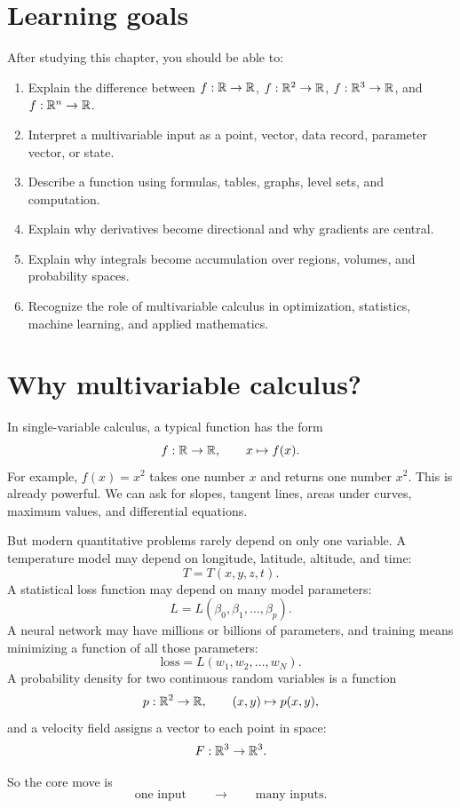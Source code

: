 \section*{Learning goals}

After studying this chapter, you should be able to:
\begin{enumerate}
  \item Explain the difference between $f:\mathbb{R}\to\mathbb{R}$, $f:\mathbb{R}^2\to\mathbb{R}$, $f:\mathbb{R}^3\to\mathbb{R}$, and $f:\mathbb{R}^n\to\mathbb{R}$.
  \item Interpret a multivariable input as a point, vector, data record, parameter vector, or state.
  \item Describe a function using formulas, tables, graphs, level sets, and computation.
  \item Explain why derivatives become directional and why gradients are central.
  \item Explain why integrals become accumulation over regions, volumes, and probability spaces.
  \item Recognize the role of multivariable calculus in optimization, statistics, machine learning, and applied mathematics.
\end{enumerate}

\section{Why multivariable calculus?}

In single-variable calculus, a typical function has the form
\[
  f:\mathbb{R}\to\mathbb{R},
  \qquad
  x\mapsto f(x).
\]
For example, $f(x)=x^2$ takes one number $x$ and returns one number $x^2$. This is already powerful. We can ask for slopes, tangent lines, areas under curves, maximum values, and differential equations.

But modern quantitative problems rarely depend on only one variable. A temperature model may depend on longitude, latitude, altitude, and time:
\[
  T=T(x,y,z,t).
\]
A statistical loss function may depend on many model parameters:
\[
  L=L(\beta_0,\beta_1,\dots,\beta_p).
\]
A neural network may have millions or billions of parameters, and training means minimizing a function of all those parameters:
\[
  \text{loss}=L(w_1,w_2,\dots,w_N).
\]
A probability density for two continuous random variables is a function
\[
  p:\mathbb{R}^2\to\mathbb{R},
  \qquad
  (x,y)\mapsto p(x,y),
\]
and a velocity field assigns a vector to each point in space:
\[
  F:\mathbb{R}^3\to\mathbb{R}^3.
\]

So the core move is
\[
  \text{one input} \qquad \longrightarrow \qquad \text{many inputs}.
\]

